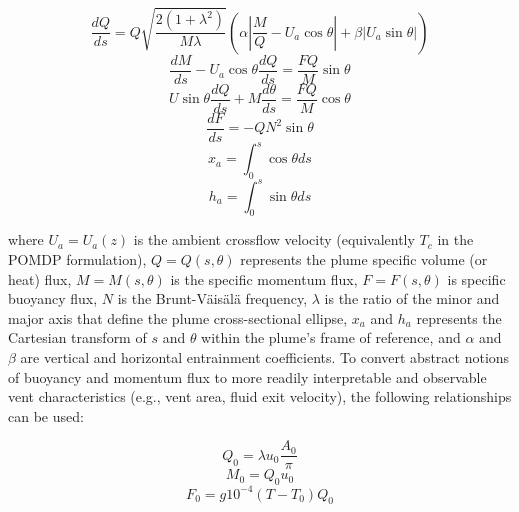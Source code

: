 \begin{equation}
    \frac{dQ}{ds} = Q\sqrt{\frac{2(1+\lambda^2)}{M\lambda}}(\alpha|\frac{M}{Q} - U_a\cos\theta| + \beta|U_a\sin\theta|)
\end{equation}
\begin{equation}
    \frac{dM}{ds} - U_a\cos\theta\frac{dQ}{ds} = \frac{FQ}{M}\sin\theta 
\end{equation}
\begin{equation}
    U\sin\theta\frac{dQ}{ds} + M\frac{d\theta}{ds} = \frac{FQ}{M}\cos\theta
\end{equation}
\begin{equation}
    \frac{dF}{ds} = -QN^2\sin\theta
\end{equation}
\begin{equation}
    x_a = \int_0^s\cos\theta ds
\end{equation}
\begin{equation}
    h_a = \int_0^s \sin\theta ds
\end{equation}

\noindent where $U_a = U_a(z)$ is the ambient crossflow velocity (equivalently $T_c$ in the POMDP formulation), $Q = Q(s,\theta)$ represents the plume specific volume (or heat) flux, $M = M(s, \theta)$ is the specific momentum flux, $F = F(s, \theta)$ is specific buoyancy flux, $N$ is the Brunt-V\"ais\"al\"a frequency, $\lambda$ is the ratio of the minor and major axis that define the plume cross-sectional ellipse, $x_a$ and $h_a$ represents the Cartesian transform of $s$ and $\theta$ within the plume's frame of reference, and $\alpha$ and $\beta$ are vertical and horizontal entrainment coefficients. To convert abstract notions of buoyancy and momentum flux to more readily interpretable and observable vent characteristics (e.g., vent area, fluid exit velocity), the following relationships can be used:

\begin{equation}
    Q_0 = \lambda u_0 \frac{A_0}{\pi}
\label{eq:heat_flux}
\end{equation}
\begin{equation}
    M_0 = Q_0 u_0
\label{eq:momentum_flux}
\end{equation}
\begin{equation}
    F_0 = g10^{-4}(T-T_0)Q_0
\label{eq:buoyancy_flux}
\end{equation}


